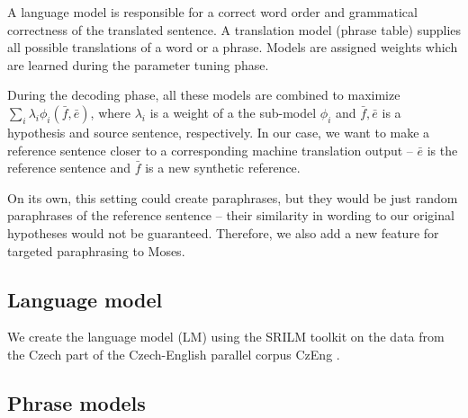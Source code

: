 A language model is responsible for a correct word order and grammatical correctness 
of the translated sentence. A translation model (phrase table) supplies all possible 
translations of a word or a phrase. Models are assigned weights which are learned 
during the parameter tuning phase.

During the decoding phase, all these models are combined to maximize 
$ \sum_i \lambda_i \phi_i (\bar{f},\bar{e}) $, where  $ \lambda_i $ is a weight 
of a the sub-model $ \phi_i $ and $ \bar{f},\bar{e} $ is a hypothesis and source 
sentence, respectively. In our case, we want to make a reference sentence closer
to a corresponding machine translation output -- $ \bar{e} $ is the reference 
sentence and $ \bar{f} $ is a new synthetic reference.

On its own, this setting could create paraphrases, but they would be just random
paraphrases of the reference sentence -- their similarity in wording to our original 
hypotheses would not be guaranteed. Therefore, we also add a new feature for targeted 
paraphrasing to Moses.

\subsection{Language model}
We create the language model (LM) using the SRILM toolkit \cite{srilm} on the 
data from the Czech part of the Czech-English parallel corpus CzEng \cite{czeng}. 

\subsection{Phrase models}

